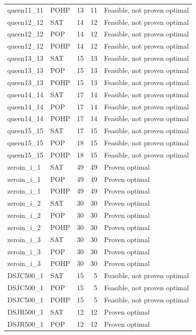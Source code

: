 \begin{longtable}{llrrl}
queen11\_11 & POHP & 13 & 11 & Feasible, not proven optimal \\
queen12\_12 & SAT & 14 & 12 & Feasible, not proven optimal \\
queen12\_12 & POP & 14 & 12 & Feasible, not proven optimal \\
queen12\_12 & POHP & 14 & 12 & Feasible, not proven optimal \\
queen13\_13 & SAT & 15 & 13 & Feasible, not proven optimal \\
queen13\_13 & POP & 15 & 13 & Feasible, not proven optimal \\
queen13\_13 & POHP & 15 & 13 & Feasible, not proven optimal \\
queen14\_14 & SAT & 17 & 14 & Feasible, not proven optimal \\
queen14\_14 & POP & 17 & 14 & Feasible, not proven optimal \\
queen14\_14 & POHP & 17 & 14 & Feasible, not proven optimal \\
queen15\_15 & SAT & 17 & 15 & Feasible, not proven optimal \\
queen15\_15 & POP & 18 & 15 & Feasible, not proven optimal \\
queen15\_15 & POHP & 18 & 15 & Feasible, not proven optimal \\
zeroin\_i\_1 & SAT & 49 & 49 & Proven optimal \\
zeroin\_i\_1 & POP & 49 & 49 & Proven optimal \\
zeroin\_i\_1 & POHP & 49 & 49 & Proven optimal \\
zeroin\_i\_2 & SAT & 30 & 30 & Proven optimal \\
zeroin\_i\_2 & POP & 30 & 30 & Proven optimal \\
zeroin\_i\_2 & POHP & 30 & 30 & Proven optimal \\
zeroin\_i\_3 & SAT & 30 & 30 & Proven optimal \\
zeroin\_i\_3 & POP & 30 & 30 & Proven optimal \\
zeroin\_i\_3 & POHP & 30 & 30 & Proven optimal \\
DSJC500\_1 & SAT & 15 & 5 & Feasible, not proven optimal \\
DSJC500\_1 & POP & 15 & 5 & Feasible, not proven optimal \\
DSJC500\_1 & POHP & 15 & 5 & Feasible, not proven optimal \\
DSJR500\_1 & SAT & 12 & 12 & Proven optimal \\
DSJR500\_1 & POP & 12 & 12 & Proven optimal \\

\end{longtable}

